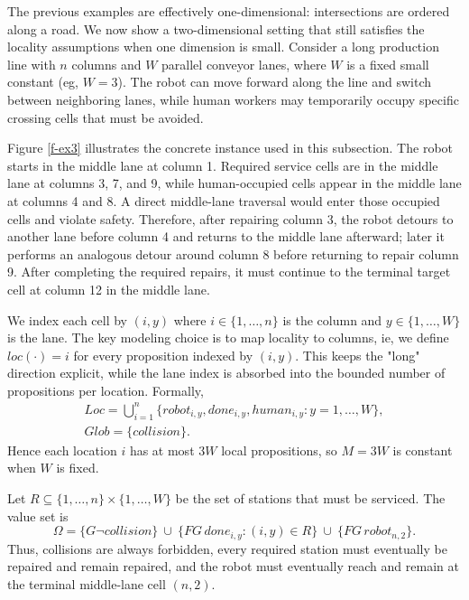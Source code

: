 \documentclass[]{jair}
\begin{document}
The previous examples are effectively one-dimensional: intersections are ordered along a road.
We now show a two-dimensional setting that still satisfies the locality assumptions when one dimension is small.
Consider a long production line with $n$ columns and $W$ parallel conveyor lanes, where $W$ is a fixed small constant (eg, $W=3$). The robot can move forward along the line and switch between neighboring lanes, while human workers may temporarily occupy specific crossing cells that must be avoided.

Figure \ref{f-ex3} illustrates the concrete instance used in this subsection. The robot starts in the middle lane at column 1. Required service cells are in the middle lane at columns 3, 7, and 9, while human-occupied cells appear in the middle lane at columns 4 and 8. A direct middle-lane traversal would enter those occupied cells and violate safety. Therefore, after repairing column 3, the robot detours to another lane before column 4 and returns to the middle lane afterward; later it performs an analogous detour around column 8 before returning to repair column 9. After completing the required repairs, it must continue to the terminal target cell at column 12 in the middle lane.

We index each cell by $(i,y)$ where $i\in\{1,\dots,n\}$ is the column and $y\in\{1,\dots,W\}$ is the lane.
The key modeling choice is to map locality to columns, ie, we define $loc(\cdot)=i$ for every proposition indexed by $(i,y)$.
This keeps the "long" direction explicit, while the lane index is absorbed into the bounded number of propositions per location.
Formally,
\begin{equation}
\begin{aligned}
Loc = \bigcup_{i=1}^n \{robot_{i,y}, done_{i,y}, human_{i,y}: y=1,\dots,W\},\\
Glob=\{collision\}.
\end{aligned}
\end{equation}
Hence each location $i$ has at most $3W$ local propositions, so $M=3W$ is constant when $W$ is fixed.

Let $R\subseteq \{1,\dots,n\}\times\{1,\dots,W\}$ be the set of stations that must be serviced.
The value set is
\begin{equation}
\Omega=\{G\neg collision\}\ \cup\ \{FG\,done_{i,y}:(i,y)\in R\}\ \cup\ \{FG\,robot_{n,2}\}.
\end{equation}
Thus, collisions are always forbidden, every required station must eventually be repaired and remain repaired, and the robot must eventually reach and remain at the terminal middle-lane cell $(n,2)$.
\end{document}
